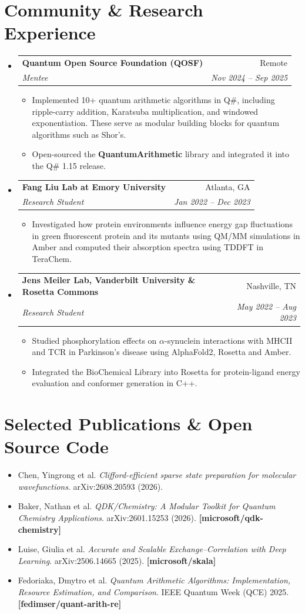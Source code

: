 \documentclass[11pt, letterpaper]{article}
\makeatletter
\newcommand{\resumeSubheading}[4]{
  \vspace{2pt}\item
    \begin{tabular*}{1.0\textwidth}[t]{l@{\extracolsep{\fill}}r}
      \textbf{#1} & #2 \\
      \textit{\small#3} & \textit{\small #4} \\
    \end{tabular*}\vspace{-6pt}
}
\newcommand{\resumeItemListStart}{\begin{itemize}[leftmargin=0.15in, label={--}, itemsep=-2pt]}
\newcommand{\resumeItemListEnd}{\end{itemize}\vspace{-6pt}}
\newcommand{\resumeItem}[1]{\item\small{#1}}
\makeatother
\begin{document}
\section{Community \& Research Experience}
\begin{itemize}[leftmargin=0in, label={}, itemsep=0pt]
    \resumeSubheading
      {Quantum Open Source Foundation (QOSF)}{Remote}
      {Mentee}{Nov 2024 -- Sep 2025}
      \resumeItemListStart
        \resumeItem{Implemented 10+ quantum arithmetic algorithms in Q\#, including ripple-carry addition, Karatsuba multiplication, and windowed exponentiation. These serve as modular building blocks for quantum algorithms such as Shor's.}
        \resumeItem{Open-sourced the \textbf{QuantumArithmetic} library and integrated it into the Q\# 1.15 release.}
      \resumeItemListEnd
    
    \resumeSubheading
      {Fang Liu Lab at Emory University}{Atlanta, GA}
      {Research Student}{Jan 2022 -- Dec 2023}
      \resumeItemListStart
        \resumeItem{Investigated how protein environments influence energy gap fluctuations in green fluorescent protein and its mutants using QM/MM simulations in Amber and computed their absorption spectra using TDDFT in TeraChem.}
      \resumeItemListEnd
      
    \resumeSubheading
      {Jens Meiler Lab, Vanderbilt University \& Rosetta Commons}{Nashville, TN}
      {Research Student}{May 2022 -- Aug 2023}
      \resumeItemListStart
        \resumeItem{Studied phosphorylation effects on $\alpha$-synuclein interactions with MHCII and TCR in Parkinson's disease using AlphaFold2, Rosetta and Amber.}
        \resumeItem{Integrated the BioChemical Library into Rosetta for protein-ligand energy evaluation and conformer generation in C++.}
       \resumeItemListEnd
    
\end{itemize}


\section{Selected Publications \& Open Source Code}
\begin{itemize}[leftmargin=0.15in, label={--}, itemsep=-2pt]
  \resumeItem{Chen, Yingrong et al. \textit{Clifford-efficient sparse state preparation for molecular wavefunctions}. arXiv:2608.20593 (2026).}
  \resumeItem{Baker, Nathan et al. \textit{QDK/Chemistry: A Modular Toolkit for Quantum Chemistry Applications}. arXiv:2601.15253 (2026). \textbf{[microsoft/qdk-chemistry]}}
  \resumeItem{Luise, Giulia et al. \textit{Accurate and Scalable Exchange--Correlation with Deep Learning}. arXiv:2506.14665 (2025). \textbf{[microsoft/skala]}}
  \resumeItem{Fedoriaka, Dmytro et al. \textit{Quantum Arithmetic Algorithms: Implementation, Resource Estimation, and Comparison}. IEEE Quantum Week (QCE) 2025. \textbf{[fedimser/quant-arith-re]}}
\end{itemize}
\end{document}
